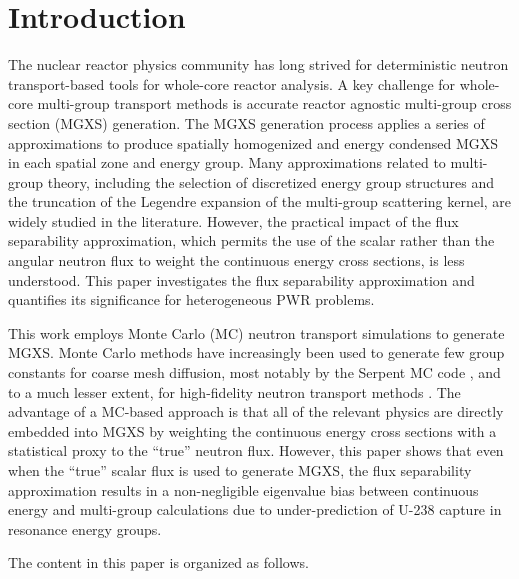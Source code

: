 \section{Introduction}
\label{sec:intro}

The nuclear reactor physics community has long strived for deterministic neutron transport-based tools for whole-core reactor analysis. A key challenge for whole-core multi-group transport methods is accurate reactor agnostic multi-group cross section (MGXS) generation. The MGXS generation process applies a series of approximations to produce spatially homogenized and energy condensed MGXS in each spatial zone and energy group. Many approximations related to multi-group theory, including the selection of discretized energy group structures and the truncation of the Legendre expansion of the multi-group scattering kernel, are widely studied in the literature. However, the practical impact of the flux separability approximation, which permits the use of the scalar rather than the angular neutron flux to weight the continuous energy cross sections, is less understood. This paper investigates the flux separability approximation and quantifies its significance for heterogeneous PWR problems.

This work employs Monte Carlo (MC) neutron transport simulations to generate MGXS. Monte Carlo methods have increasingly been used to generate few group constants for coarse mesh diffusion, most notably by the Serpent MC code \citep{serpent2013manual}, and to a much lesser extent, for high-fidelity neutron transport methods \citep{redmond1997multigroup, nelson2014improved, cai2014condensation, boyd2016thesis}. The advantage of a MC-based approach is that all of the relevant physics are directly embedded into MGXS by weighting the continuous energy cross sections with a statistical proxy to the ``true'' neutron flux. However, this paper shows that even when the ``true'' scalar flux is used to generate MGXS, the flux separability approximation results in a non-negligible eigenvalue bias between continuous energy and multi-group calculations due to under-prediction of U-238 capture in resonance energy groups.

The content in this paper is organized as follows.
